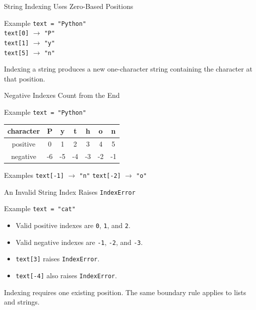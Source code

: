 \documentclass[aspectratio=169,10pt]{beamer}
\begin{document}

\begin{frame}{String Indexing Uses Zero-Based Positions}
  \begin{block}{Example}
    \texttt{text = "Python"}\\[0.08in]
    \texttt{text[0]} $\longrightarrow$ \texttt{"P"}\\
    \texttt{text[1]} $\longrightarrow$ \texttt{"y"}\\
    \texttt{text[5]} $\longrightarrow$ \texttt{"n"}
  \end{block}

  \begin{keyidea}
    Indexing a string produces a new one-character string containing the character at that position.
  \end{keyidea}
\end{frame}

\begin{frame}{Negative Indexes Count from the End}
  \begin{block}{Example}
    \texttt{text = "Python"}
  \end{block}

  \begin{center}
    \renewcommand{\arraystretch}{1.3}
    \begin{tabular}{c|c|c|c|c|c|c}
      character & P & y & t & h & o & n \\\hline
      positive & 0 & 1 & 2 & 3 & 4 & 5 \\
      negative & -6 & -5 & -4 & -3 & -2 & -1
    \end{tabular}
  \end{center}

  \begin{block}{Examples}
    \texttt{text[-1]} $\longrightarrow$ \texttt{"n"}\qquad
    \texttt{text[-2]} $\longrightarrow$ \texttt{"o"}
  \end{block}
\end{frame}

\begin{frame}{An Invalid String Index Raises \texttt{IndexError}}
  \begin{block}{Example}
    \texttt{text = "cat"}
  \end{block}

  \begin{itemize}
    \item Valid positive indexes are \texttt{0}, \texttt{1}, and \texttt{2}.
    \item Valid negative indexes are \texttt{-1}, \texttt{-2}, and \texttt{-3}.
    \item \texttt{text[3]} raises \texttt{IndexError}.
    \item \texttt{text[-4]} also raises \texttt{IndexError}.
  \end{itemize}

  \begin{keyidea}
    Indexing requires one existing position. The same boundary rule applies to lists and strings.
  \end{keyidea}
\end{frame}
\end{document}
